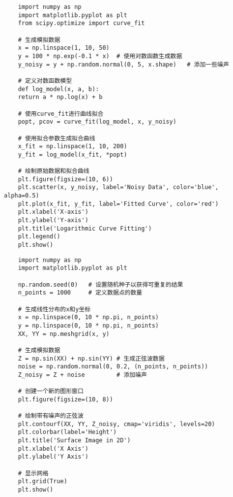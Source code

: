 \documentclass{article}
\begin{document}
\clearpage
{}
\begin{lstlisting}
	import numpy as np
	import matplotlib.pyplot as plt
	from scipy.optimize import curve_fit
	
	# 生成模拟数据
	x = np.linspace(1, 10, 50)
	y = 100 * np.exp(-0.1 * x)  # 使用对数函数生成数据
	y_noisy = y + np.random.normal(0, 5, x.shape)	# 添加一些噪声
	
	# 定义对数函数模型
	def log_model(x, a, b):
	return a * np.log(x) + b
	
	# 使用curve_fit进行曲线拟合
	popt, pcov = curve_fit(log_model, x, y_noisy)
	
	# 使用拟合参数生成拟合曲线
	x_fit = np.linspace(1, 10, 200)
	y_fit = log_model(x_fit, *popt)
	
	# 绘制原始数据和拟合曲线
	plt.figure(figsize=(10, 6))
	plt.scatter(x, y_noisy, label='Noisy Data', color='blue', alpha=0.5)
	plt.plot(x_fit, y_fit, label='Fitted Curve', color='red')
	plt.xlabel('X-axis')
	plt.ylabel('Y-axis')
	plt.title('Logarithmic Curve Fitting')
	plt.legend()
	plt.show()
\end{lstlisting}

\clearpage
{}
\begin{lstlisting}
	import numpy as np
	import matplotlib.pyplot as plt
	
	np.random.seed(0)	# 设置随机种子以获得可重复的结果
	n_points = 1000		# 定义数据点的数量
	
	# 生成线性分布的x和y坐标
	x = np.linspace(0, 10 * np.pi, n_points)
	y = np.linspace(0, 10 * np.pi, n_points)
	XX, YY = np.meshgrid(x, y)
	
	# 生成模拟数据
	Z = np.sin(XX) + np.sin(YY)	# 生成正弦波数据
	noise = np.random.normal(0, 0.2, (n_points, n_points))
	Z_noisy = Z + noise			# 添加噪声
	
	# 创建一个新的图形窗口
	plt.figure(figsize=(10, 8))
	
	# 绘制带有噪声的正弦波
	plt.contourf(XX, YY, Z_noisy, cmap='viridis', levels=20)
	plt.colorbar(label='Height')
	plt.title('Surface Image in 2D')
	plt.xlabel('X Axis')
	plt.ylabel('Y Axis')
	
	# 显示网格
	plt.grid(True)
	plt.show()
\end{lstlisting}
\end{document}
